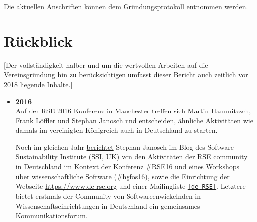 Die aktuellen Anschriften können dem Gründungsprotokoll entnommen werden.

\section{Rückblick}

[Der vollständigkeit halber und um die wertvollen Arbeiten auf die Vereinsgründung hin zu berücksichtigen umfasst dieser Bericht auch zeitlich vor 2018 liegende Inhalte.]

\begin{itemize}
 \item \textbf{2016}\\
 Auf der RSE 2016 Konferenz in Manchester treffen sich Martin Hammitzsch, Frank Löffler und Stephan Janosch und entscheiden, ähnliche Aktivitäten wie damals im vereinigten Königreich auch in Deutschland zu starten.
 
 Noch im gleichen Jahr \href{https://www.software.ac.uk/blog/2016-12-19-research-software-germany-brief-report-efforts-autumn-2016}{berichtet} Stephan Janosch im Blog des Software Sustainability Institute (SSI, UK) von den Aktivitäten der RSE community in Deutschland im Kontext der Konferenz \href{https://ukrse.github.io/conf2016.html}{\#RSE16} und eines Workshops über wissenschaftliche Software (\href{https://twitter.com/hashtag/hgfos16}{\#hgfos16}), sowie die Einrichtung der Webseite \href{https://www.de-rse.org}{https://www.de-rse.org} und einer Mailingliste \href{https://ml-cgn04.ispgateway.de/mailman/listinfo/liste_de-rse.org}{\texttt{[de-RSE]}}.
 Letztere bietet erstmals der Community von Softwareenwickelnden in Wissenschaftseinrichtungen in Deutschland ein gemeinsames Kommunikationsforum.


\end{itemize}
